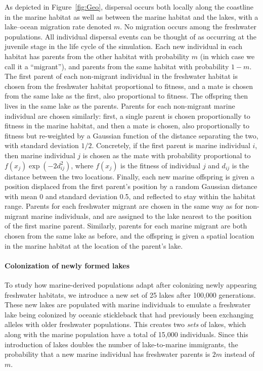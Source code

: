 \documentclass{article}
\begin{document}
As depicted in Figure~\ref{fig:Geo}, dispersal occurs both locally along the coastline in the marine habitat as well as between the marine habitat and the lakes,
with a lake--ocean migration rate denoted $m$. No migration occurs among the freshwater populations. All individual dispersal events can be thought of as occurring at the juvenile stage in the life cycle of the simulation. 
Each new individual in each habitat has parents from the other habitat with probability $m$ (in which case we call it a ``migrant''), and parents from the same habitat with probability $1-m$.
The first parent of each non-migrant individual in the freshwater habitat is chosen from the freshwater habitat proportional to fitness, and a mate is chosen from the same lake as the first, also proportional to fitness. The offspring then lives in the same lake as the parents. Parents for each non-migrant marine individual are chosen similarly:
first, a single parent is chosen proportionally to fitness in the marine habitat, and then a mate is chosen, also proportionally to fitness but re-weighted by a Gaussian function of the distance separating the two, with standard deviation $1/2$. Concretely, if the first parent is marine individual $i$, then marine individual $j$ is chosen as the mate with probability proportional to $f(x_j) \exp(-2d_{ij}^2)$, where $f(x_j)$ is the fitness of individual $j$ and $d_{ij}$ is the distance between the two locations. 
Finally, each new marine offspring is given a position displaced from the first parent's position by a random Gaussian distance with mean 0 and standard deviation 0.5, and reflected to stay within the habitat range.
Parents for each freshwater migrant are chosen in the same way as for non-migrant marine individuals, and are assigned to the lake nearest to the position of the first marine parent. Similarly, parents for each marine migrant are both chosen from the same lake as before, and the offspring is given a spatial location in the marine habitat at the location of the parent's lake. 

\paragraph{Colonization of newly formed lakes} 

To study how marine-derived populations adapt after colonizing newly appearing freshwater habitats, we introduce a new set of 25 lakes after 100,000 generations. 
These new lakes are populated with marine individuals to emulate a freshwater lake being colonized by oceanic stickleback that had previously been exchanging alleles with older freshwater populations. 
This creates two \emph{sets} of lakes, which along with the marine population have a total of 15,000 individuals. Since this introduction of lakes doubles the number of lake-to-marine immigrants, the probability that a new marine individual has freshwater parents is $2m$ instead of $m$.
\end{document}
